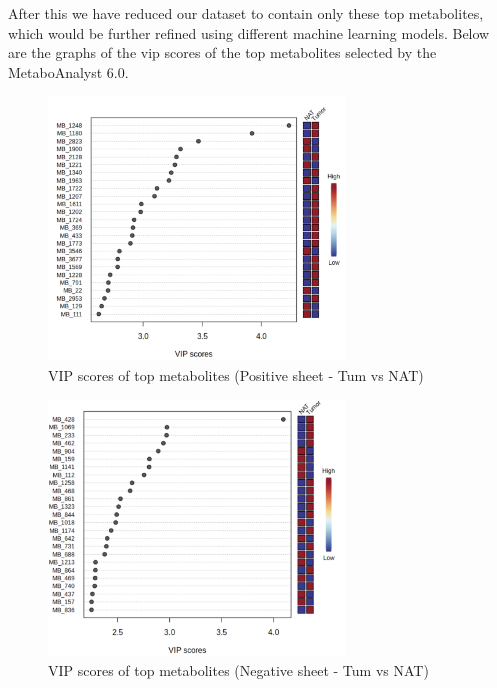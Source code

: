 \documentclass[a4paper,12pt]{article}
\begin{document}
After this we have reduced our dataset to contain only these top metabolites, which would be further refined using different machine learning models. Below are the graphs of the vip scores of the top metabolites selected by the MetaboAnalyst 6.0.
\begin{figure}[H]
	\centering
	\includegraphics[width=0.7\textwidth]{images/oplsda_positive.png}
	\caption{VIP scores of top metabolites (Positive sheet - Tum vs NAT)}
	\label{fig:vip_positive_tum_nat}
\end{figure}

\begin{figure}[H]
	\centering
	\includegraphics[width=0.7\textwidth]{images/oplsda_negative.png}
	\caption{VIP scores of top metabolites (Negative sheet - Tum vs NAT)}
	\label{fig:vip_negative_tum_nat}
\end{figure}
\end{document}
